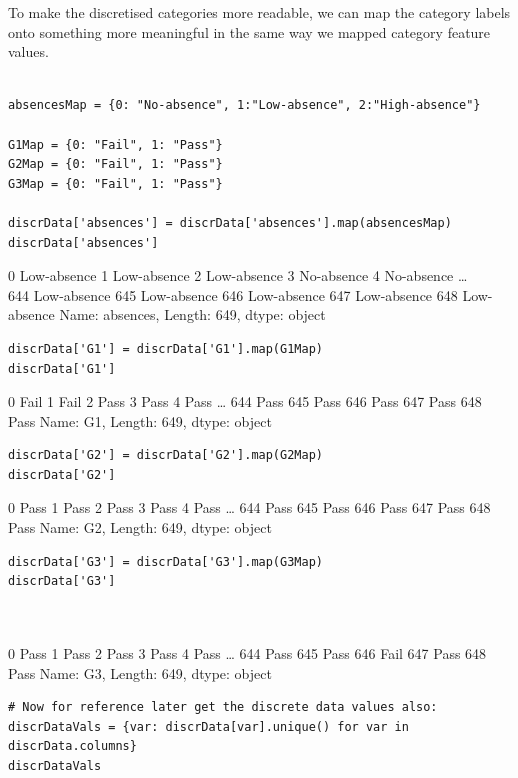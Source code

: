 \documentclass[
]{article}
\begin{document}
To make the discretised categories more readable, we can map the
category labels onto something more meaningful in the same way we mapped
category feature values.

\begin{verbatim}

absencesMap = {0: "No-absence", 1:"Low-absence", 2:"High-absence"}

G1Map = {0: "Fail", 1: "Pass"}
G2Map = {0: "Fail", 1: "Pass"}
G3Map = {0: "Fail", 1: "Pass"}

discrData['absences'] = discrData['absences'].map(absencesMap)
discrData['absences']
\end{verbatim}

0 Low-absence 1 Low-absence 2 Low-absence 3 No-absence 4 No-absence
\ldots{}\\
644 Low-absence 645 Low-absence 646 Low-absence 647 Low-absence 648
Low-absence Name: absences, Length: 649, dtype: object

\begin{verbatim}
discrData['G1'] = discrData['G1'].map(G1Map)
discrData['G1']
\end{verbatim}

0 Fail 1 Fail 2 Pass 3 Pass 4 Pass \ldots{} 644 Pass 645 Pass 646 Pass
647 Pass 648 Pass Name: G1, Length: 649, dtype: object

\begin{verbatim}
discrData['G2'] = discrData['G2'].map(G2Map)
discrData['G2']
\end{verbatim}

0 Pass 1 Pass 2 Pass 3 Pass 4 Pass \ldots{} 644 Pass 645 Pass 646 Pass
647 Pass 648 Pass Name: G2, Length: 649, dtype: object

\begin{verbatim}
discrData['G3'] = discrData['G3'].map(G3Map)
discrData['G3']



\end{verbatim}

0 Pass 1 Pass 2 Pass 3 Pass 4 Pass \ldots{} 644 Pass 645 Pass 646 Fail
647 Pass 648 Pass Name: G3, Length: 649, dtype: object

\begin{verbatim}
# Now for reference later get the discrete data values also:
discrDataVals = {var: discrData[var].unique() for var in discrData.columns}
discrDataVals
\end{verbatim}
\end{document}
